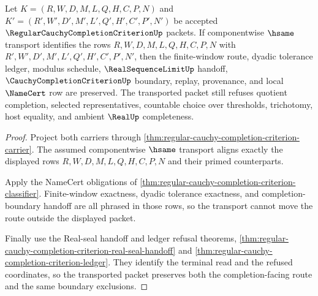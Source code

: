 \begin{theorem}
\label{thm:regular-cauchy-completion-criterion-transport-stability}
Let $K=(R,W,D,M,L,Q,H,C,P,N)$ and $K'=(R',W',D',M',L',Q',H',C',P',N')$ be accepted $\RegularCauchyCompletionCriterionUp$ packets. If componentwise $\hsame$ transport identifies the rows $R,W,D,M,L,Q,H,C,P,N$ with $R',W',D',M',L',Q',H',C',P',N'$, then the finite-window route, dyadic tolerance ledger, modulus schedule, $\RealSequenceLimitUp$ handoff, $\CauchyCompletionCriterionUp$ boundary, replay, provenance, and local $\NameCert$ row are preserved. The transported packet still refuses quotient completion, selected representatives, countable choice over thresholds, trichotomy, host equality, and ambient $\RealUp$ completeness.
\end{theorem}
\begin{proof}
Project both carriers through \autoref{thm:regular-cauchy-completion-criterion-carrier}. The assumed componentwise $\hsame$ transport aligns exactly the displayed rows $R,W,D,M,L,Q,H,C,P,N$ and their primed counterparts.

Apply the NameCert obligations of \autoref{thm:regular-cauchy-completion-criterion-classifier}. Finite-window exactness, dyadic tolerance exactness, and completion-boundary handoff are all phrased in those rows, so the transport cannot move the route outside the displayed packet.

Finally use the Real-seal handoff and ledger refusal theorems, \autoref{thm:regular-cauchy-completion-criterion-real-seal-handoff} and \autoref{thm:regular-cauchy-completion-criterion-ledger}. They identify the terminal read and the refused coordinates, so the transported packet preserves both the completion-facing route and the same boundary exclusions.
\end{proof}

